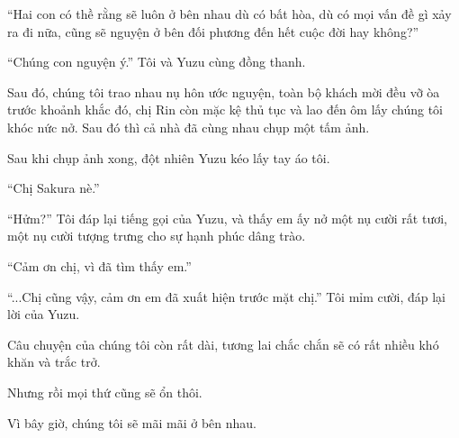 {``Hai con có thề rằng sẽ luôn ở bên nhau dù có bất hòa, dù có mọi vấn đề
gì xảy ra đi nữa, cũng sẽ nguyện ở bên đối phương đến hết cuộc đời hay
không?''

``Chúng con nguyện ý.'' Tôi và Yuzu cùng đồng thanh.

Sau đó, chúng tôi trao nhau nụ hôn ước nguyện, toàn bộ khách mời đều vỡ
òa trước khoảnh khắc đó, chị Rin còn mặc kệ thủ tục và lao đến ôm lấy
chúng tôi khóc nức nở. Sau đó thì cả nhà đã cùng nhau chụp một tấm ảnh.

Sau khi chụp ảnh xong, đột nhiên Yuzu kéo lấy tay áo tôi.

``Chị Sakura nè.''

``Hửm?'' Tôi đáp lại tiếng gọi của Yuzu, và thấy em ấy nở một nụ cười
rất tươi, một nụ cười tượng trưng cho sự hạnh phúc dâng trào.

``Cảm ơn chị, vì đã tìm thấy em.''

``...Chị cũng vậy, cảm ơn em đã xuất hiện trước mặt chị.'' Tôi mỉm cười,
đáp lại lời của Yuzu.

Câu chuyện của chúng tôi còn rất dài, tương lai chắc chắn sẽ có rất
nhiều khó khăn và trắc trở.

Nhưng rồi mọi thứ cũng sẽ ổn thôi.

Vì bây giờ, chúng tôi sẽ mãi mãi ở bên nhau.

}
